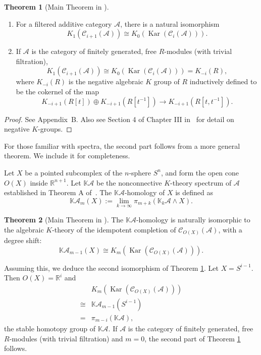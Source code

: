 \documentclass{article}
\theoremstyle{definition}
\newcommand{\CA}{{ \mathcal A}}
\newtheorem{thm}{Theorem}
\newcommand{\R}{\mathbb R}
\begin{document}
\begin{thm} [Main Theorem in \cite{pedersen1982ki}] \label{thm:Main}
\begin{enumerate}
    \item For a filtered additive category $\CA$, there is a natural isomorphism 
$$ K_1(\mathcal{C}_{i+1}(\CA)) \cong K_0(\operatorname{Kar}(\mathcal{C}_{i}(\CA))).$$
\item If $\CA$ is the category of finitely generated, free $R$-modules (with trivial filtration), 
    $$ K_1(\mathcal{C}_{i+1}(\CA)) \cong K_0(\operatorname{Kar}(\mathcal{C}_{i}(\CA)))= K_{-i}(R),$$ where $K_{-i}(R)$ is the negative algebraic $K$ group of $R$ inductively defined to be the cokernel of the map $$K_{-i+1}(R[t]) \oplus K_{-i+1}(R[t^{-1}]) \to K_{-i+1}(R[t,t^{-1}]).$$ 

\end{enumerate}
\end{thm}
\begin{proof}
    See Appendix~B. Also see Section 4 of Chapter III in~\cite{weibel2013k} for detail on negative $K$-groups. 
\end{proof}
For those familiar with spectra, the second part follows from a more general theorem. We include it for completeness.

Let $X$ be a pointed subcomplex of the $n$-sphere $S^n$, and form the open cone $O(X)$ inside $\R^{n+1}$. Let $\mathbb K\CA$ be the nonconnective $K$-theory spectrum of $\CA$ established in Theorem A of~\cite{pedersen2006nonconnective}. The $\mathbb K\CA$-homology of $X$ is defined as 
$$ \mathbb K\CA_m(X):=\lim_{k\rightarrow \infty}\pi_{m+k}(\mathbb K_k\CA\wedge X).$$ 
\begin{thm}[Main Theorem in \cite{pedersen1989k}]\label{thm:main2}
     The $\mathbb K\CA$-homology is naturally isomorphic to the algebraic $K$-theory of the idempotent completion of $\mathcal{C}_{O(X)}(\CA)$, with a degree shift:
    $$ \mathbb K\CA_{m-1}(X)\cong K_m(\operatorname{Kar}(\mathcal{C}_{O(X)}(\CA))).$$
\end{thm}
Assuming this, we deduce the second isomorphism of Theorem \ref{thm:Main}. Let $X=S^{i-1}$. Then $O(X)=\R^i$ and 
\begin{align*}
    &K_m(\operatorname{Kar}(\mathcal{C}_{O(X)}(\CA)))\\
    \cong & \mathbb K\CA_{m-1}(S^{i-1})\\
    =&\pi_{m-i}(\mathbb K\CA),
\end{align*}
the stable homotopy group of $\mathbb K\CA$. If $\CA$ is the category of finitely generated, free $R$-modules (with trivial filtration) and $m=0$, the second part of Theorem \ref{thm:Main} follows. 
\end{document}
